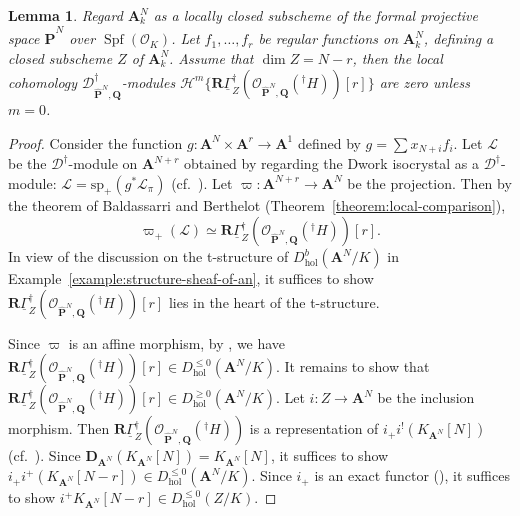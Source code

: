 \documentclass{amsart}
\numberwithin{equation}{section}
\theoremstyle{plain}
\newtheorem{lemma}[equation]{Lemma}
\theoremstyle{definition}
\renewcommand{\mathbb}{\mathbf}
\begin{document}
\begin{lemma}\label{lemma:local-cohomology}
Regard \(\mathbb{A}^{N}_{k}\) as a locally closed subscheme of the
formal projective space \(\widehat{\mathbb{P}}^{N}\) over
\(\operatorname{Spf}(\mathcal{O}_{K})\).  Let \(f_{1},\ldots, f_{r}\)
be regular functions on \(\mathbb{A}^{N}_{k}\), defining a closed
subscheme \(Z\) of \(\mathbb{A}^{N}_{k}\).  Assume that
\(\dim Z = N-r\), then the local cohomology
\(\mathscr{D}^{\dagger}_{\widehat{\mathbb{P}}^{N},\mathbb{Q}}\)-modules
\(\mathcal{H}^{m}\{\mathbb{R}\underline{\Gamma}_{Z}^{\dagger}(\mathcal{O}_{\widehat{\mathbb{P}}^{N},\mathbb{Q}}({}^{\dagger}H))[r]\}\)
are zero unless \(m = 0\).
\end{lemma}

\begin{proof}
Consider the function
\(g\colon \mathbb{A}^{N}\times \mathbb{A}^{r} \to \mathbb{A}^{1}\)
defined by \(g = \sum x_{N+i}f_{i}\).  Let \(\mathcal{L}\) be the
\(\mathscr{D}^{\dagger}\)-module on \(\mathbb{A}^{N+r}\) obtained by
regarding the Dwork isocrystal as a \(\mathscr{D}^{\dagger}\)-module:
\(\mathcal{L}=\mathrm{sp}_{+}(g^{\ast}\mathcal{L}_{\pi})\)
(cf.~\cite[\S1.2.14]{abe-caro:theory-of-weights-in-p-adic-cohomology}).
Let \(\varpi\colon \mathbb{A}^{N+r} \to \mathbb{A}^{N}\) be the
projection.  Then by the theorem of Baldassarri and Berthelot
(Theorem~\ref{theorem:local-comparison}),
\begin{equation*}
\varpi_{+}(\mathcal{L}) \simeq \mathbb{R}\underline{\Gamma}^{\dagger}_{Z}(\mathcal{O}_{\widehat{\mathbb{P}}^{N},\mathbb{Q}}({}^{\dagger}H))[r].
\end{equation*}
In view of the discussion on the t-structure of
\(D^{b}_{\mathrm{hol}}(\mathbb{A}^{N}/K)\) in
Example~\ref{example:structure-sheaf-of-an}, it suffices to show
\(\mathbb{R}\underline{\Gamma}^{\dagger}_{Z}(\mathcal{O}_{\widehat{\mathbb{P}}^{N},\mathbb{Q}}({}^{\dagger}H))[r]\)
lies in the heart of the t-structure.

Since \(\varpi\) is an affine morphism, by
\cite[Proposition~1.3.3]{abe-caro:theory-of-weights-in-p-adic-cohomology},
we have
\(\mathbb{R}\underline{\Gamma}^{\dagger}_{Z}(\mathcal{O}_{\widehat{\mathbb{P}}^{N},\mathbb{Q}}({}^{\dagger}H))[r]\in D_{\mathrm{hol}}^{\leq0}(\mathbb{A}^{N}/K)\).
It remains to show that
\(\mathbb{R}\underline{\Gamma}^{\dagger}_{Z}(\mathcal{O}_{\widehat{\mathbb{P}}^{N},\mathbb{Q}}({}^{\dagger}H))[r]\in D^{\geq0}_{\mathrm{hol}}(\mathbb{A}^{N}/K)\).
Let \(i\colon Z \to \mathbb{A}^{N}\) be the inclusion morphism.  Then
\(\mathbb{R}\underline{\Gamma}^{\dagger}_{Z}(\mathcal{O}_{\widehat{\mathbb{P}}^{N},\mathbb{Q}}({}^{\dagger}H))\)
is a representation of \(i_{+}i^{!}(K_{\mathbb{A}^N}[N])\) (cf.~\cite[\S1.1.7]{abe-caro:theory-of-weights-in-p-adic-cohomology}).
Since
\(\mathbb{D}_{\mathbb{A}^{N}}(K_{\mathbb{A}^N}[N])=K_{\mathbb{A}^N}[N]\),
it suffices to show
\(i_{+}i^{+}(K_{\mathbb{A}^N}[N-r]) \in D^{\leq0}_{\mathrm{hol}}(\mathbb{A}^{N}/K)\).
Since \(i_{+}\) is an exact functor
(\cite[Proposition~1.3.2(iii)]{abe-caro:theory-of-weights-in-p-adic-cohomology}),
it suffices to show
\(i^{+}K_{\mathbb{A}^N}[N-r] \in D^{\leq0}_{\mathrm{hol}}(Z/K)\).


\end{proof}
\end{document}
